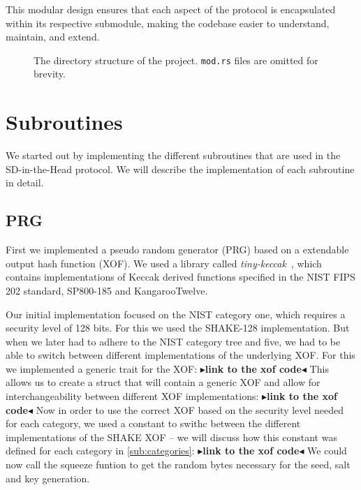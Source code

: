 \documentclass[twoside,11pt]{report}
\theoremstyle{definition}
\theoremstyle{plain}
\newcommand{\todo}[1]{{\color[rgb]{.5,0,0}\textbf{$\blacktriangleright$#1$\blacktriangleleft$}}}
\begin{document}
This modular design ensures that each aspect of the protocol is encapsulated within its respective submodule, making the codebase easier to understand, maintain, and extend.
\begin{figure}[H]
  \label{fig:structure}
  \caption{The directory structure of the project. \texttt{mod.rs} files are omitted for brevity.}
\end{figure}

\section{Subroutines}\label{sub:subroutines}

We started out by implementing the different subroutines that are used in the SD-in-the-Head protocol. We will describe the implementation of each subroutine in detail.

\subsection{PRG}
First we implemented a pseudo random generator (PRG) based on a extendable output hash function (XOF). We used a library called \textit{tiny-keccak}~\cite{tiny-keccak}, which contains implementations of Keccak derived functions specified in the NIST FIPS 202 standard, SP800-185 and KangarooTwelve.

Our initial implementation focused on the NIST category one, which requires a security level of 128 bits. For this we used the SHAKE-128 implementation. But when we later had to adhere to the NIST category tree and five, we had to be able to switch between different implementations of the underlying XOF. For this we implemented a generic trait for the XOF:
\todo{link to the xof code}
This allows us to create a struct that will contain a generic XOF and allow for interchangeability between different XOF implementations:
\todo{link to the xof code}
Now in order to use the correct XOF based on the security level needed for each category, we used a constant to swithc between the different implementations of the SHAKE XOF -- we will discuss how this constant was defined for each category in \autoref{sub:categories}:
\todo{link to the xof code}
We could now call the squeeze funtion to get the random bytes necessary for the seed, salt and key generation.
\end{document}
